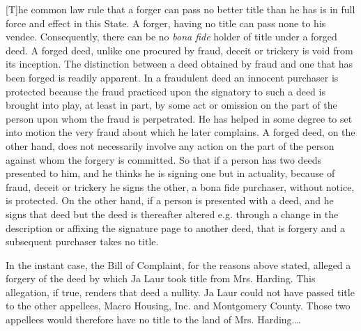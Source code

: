 [T]he common law rule that a forger can pass no better title than he has is in
full force and effect in this State. A forger, having no title can pass none to
his vendee. Consequently, there can be no \textit{bona fide} holder of title
under a forged deed. A forged deed, unlike one procured by fraud, deceit or
trickery is void from its inception. The distinction between a deed obtained by
fraud and one that has been forged is readily apparent. In a fraudulent deed an
innocent purchaser is protected because the fraud practiced upon the signatory
to such a deed is brought into play, at least in part, by some act or omission
on the part of the person upon whom the fraud is perpetrated. He has helped in
some degree to set into motion the very fraud about which he later complains. A
forged deed, on the other hand, does not necessarily involve any action on the
part of the person against whom the forgery is committed. So that if a person
has two deeds presented to him, and he thinks he is signing one but in
actuality, because of fraud, deceit or trickery he signs the other, a bona fide
purchaser, without notice, is protected. On the other hand, if a person is
presented with a deed, and he signs that deed but the deed is thereafter
altered e.g. through a change in the description or affixing the signature page
to another deed, that is forgery and a subsequent purchaser takes no title. 

In the instant case, the Bill of Complaint, for the reasons above stated,
alleged a forgery of the deed by which Ja Laur took title from Mrs. Harding.
This allegation, if true, renders that deed a nullity. Ja Laur could not have
passed title to the other appellees, Macro Housing, Inc. and Montgomery County.
Those two appellees would therefore have no title to the land of Mrs.
Harding.\ldots

